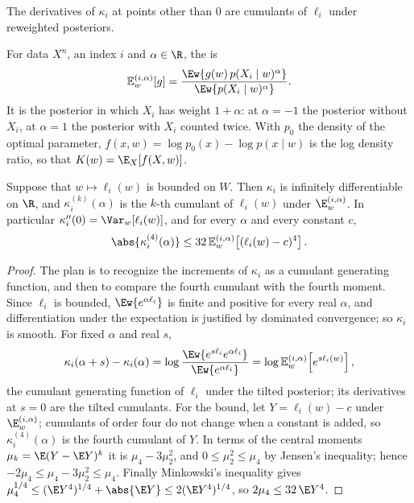 \begin{refsection}
The derivatives of $\kappa_i$ at points other than $0$ are cumulants of $\ell_i$ under reweighted posteriors.

\begin{definition}\label{def:waic:tilt}
For data $X^n$, an index $i$ and $\alpha\in\R$, the  is
\[
\waicEt{\alpha}{g}=\frac{\Ew{g(w)\,p(X_i\mid w)^\alpha}}{\Ew{p(X_i\mid w)^\alpha}}.
\]
It is the posterior in which $X_i$ has weight $1+\alpha$: at $\alpha=-1$ the posterior without $X_i$, at $\alpha=1$ the posterior with $X_i$ counted twice. With $p_0$ the density of the optimal parameter, $f(x,w)=\log p_0(x)-\log p(x\mid w)$ is the log density ratio, so that $K(w)=\E_X[f(X,w)]$.
\end{definition}

\begin{lemma}\label{lem:waic:tilted}
Suppose that $w\mapsto\ell_i(w)$ is bounded on $W$. Then $\kappa_i$ is infinitely differentiable on $\R$, and $\kappa_i^{(k)}(\alpha)$ is the $k$-th cumulant of $\ell_i(w)$ under $\E^{(i,\alpha)}_w$. In particular $\kappa_i''(0)=\Var_w[\ell_i(w)]$, and for every $\alpha$ and every constant $c$,
\[
\abs{\kappa_i^{(4)}(\alpha)}\le32\,\waicEt{\alpha}{(\ell_i(w)-c)^4}.
\]
\end{lemma}

\begin{proof}
The plan is to recognize the increments of $\kappa_i$ as a cumulant generating function, and then to compare the fourth cumulant with the fourth moment. Since $\ell_i$ is bounded, $\Ew{e^{\alpha\ell_i}}$ is finite and positive for every real $\alpha$, and differentiation under the expectation is justified by dominated convergence; so $\kappa_i$ is smooth. For fixed $\alpha$ and real $s$,
\[
\kappa_i(\alpha+s)-\kappa_i(\alpha)=\log\frac{\Ew{e^{s\ell_i}e^{\alpha\ell_i}}}{\Ew{e^{\alpha\ell_i}}}=\log\waicEt{\alpha}{e^{s\ell_i(w)}},
\]
the cumulant generating function of $\ell_i$ under the tilted posterior; its derivatives at $s=0$ are the tilted cumulants. For the bound, let $Y=\ell_i(w)-c$ under $\E^{(i,\alpha)}_w$; cumulants of order four do not change when a constant is added, so $\kappa_i^{(4)}(\alpha)$ is the fourth cumulant of $Y$. In terms of the central moments $\mu_k=\E(Y-\E Y)^k$ it is $\mu_4-3\mu_2^2$, and $0\le\mu_2^2\le\mu_4$ by Jensen's inequality; hence $-2\mu_4\le\mu_4-3\mu_2^2\le\mu_4$. Finally Minkowski's inequality gives $\mu_4^{1/4}\le(\E Y^4)^{1/4}+\abs{\E Y}\le2(\E Y^4)^{1/4}$, so $2\mu_4\le32\,\E Y^4$.
\end{proof}


\end{refsection}
